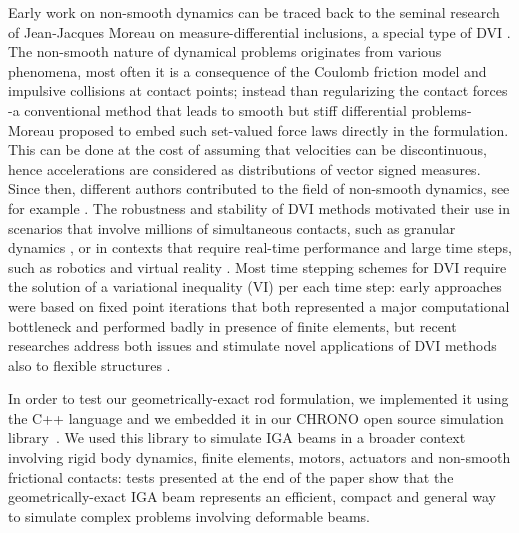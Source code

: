 \documentclass[review]{elsarticle}
\begin{document}
Early work on non-smooth dynamics can be traced back to the seminal research of Jean-Jacques Moreau on measure-differential inclusions, a special type of DVI \cite{moreau88,Moreau1987}. The non-smooth nature of dynamical problems originates from various phenomena, most often it is a consequence of the Coulomb friction model and impulsive collisions at contact points; instead than regularizing the contact forces -a conventional method that leads to smooth but stiff differential problems- Moreau proposed to embed such set-valued force laws directly in the formulation. This can be done at the cost of assuming that velocities can be discontinuous, hence accelerations are considered as distributions of vector signed measures. Since then, different authors contributed to the field of non-smooth dynamics, see for example \cite{stew98,AniHa02,pfeiffer}. 
The robustness and stability of DVI methods motivated their use in scenarios that involve millions of simultaneous contacts, such as granular dynamics \cite{NegTasLeveraging2011}, or in contexts that require real-time performance and large time steps, such as robotics and virtual reality \cite{bender2014interactive}. Most time stepping schemes for DVI require the solution of a variational inequality (VI) per each time step: early approaches were based on fixed point iterations that both represented a major computational bottleneck and performed badly in presence of finite elements, but recent researches address both issues and stimulate novel applications of DVI methods also to flexible structures \cite{Mazhar2015,heyn2013,MANGONI2018351}. 


In order to test our geometrically-exact rod formulation, we implemented it using the C++ language and we embedded it in our CHRONO open source simulation library~\cite{chrono2013}. We used this library to simulate IGA beams in a broader context involving rigid body dynamics, finite elements, motors, actuators and non-smooth frictional contacts: tests presented at the end of the paper show that the geometrically-exact IGA beam represents an efficient, compact and general way to simulate complex problems involving deformable beams.


\end{document}
